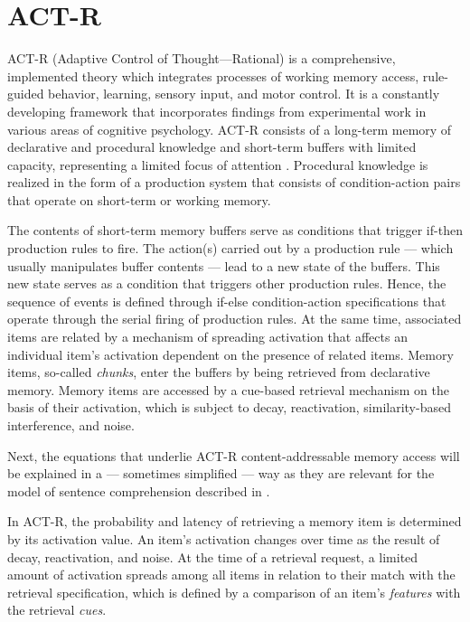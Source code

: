 \documentclass{cambridge7A}\usepackage[]{graphicx}\usepackage[]{color}
\begin{document}
\section{ACT-R}
ACT-R (Adaptive Control of Thought---Rational) is a  comprehensive, implemented theory which integrates processes of working memory access, rule-guided behavior, learning, sensory input, and motor control. 
It is a constantly developing framework that incorporates  findings from experimental work in various areas of cognitive psychology. 
ACT-R consists of a long-term memory of  declarative and  procedural knowledge and  short-term buffers with  limited capacity, representing a limited  focus of attention \citep{McElree2006,Cowan2001,Miller1956}. 
Procedural knowledge is realized in the form of a production system \citep{Newell1973,Newell1978} that consists of condition-action pairs that operate on short-term or working memory. 

The contents of short-term memory buffers serve as conditions that trigger if-then production rules  to fire. The action(s) carried out by a production rule --- which usually manipulates buffer contents --- lead to a new state of the buffers. This new state serves as a condition that triggers other production rules. Hence, the  sequence of events is defined through if-else condition-action specifications that operate through the serial firing of production rules. 
At the same time, associated items are related by a mechanism of spreading activation that affects an individual item's activation dependent on the presence of related items. Memory items, so-called  \emph{chunks}, enter the buffers by being retrieved from  declarative memory. 
Memory items are accessed by a cue-based retrieval mechanism on the basis of their activation, which is subject to  decay,  reactivation,  similarity-based interference, and  noise.

Next, the equations that underlie ACT-R content-addressable memory access will be explained in a --- sometimes simplified --- way as they are relevant for the model of sentence comprehension described in \cite{LewisVasishth2005}.

In ACT-R, the probability and latency of retrieving a memory item is determined by its activation value. An item's activation changes over time as the result of decay, reactivation, and noise. At the time of a retrieval request, a limited amount of activation spreads among all items in relation to their match with the retrieval specification, which is defined by a comparison of an item's \textit{features} with the retrieval \textit{cues}.
\end{document}
